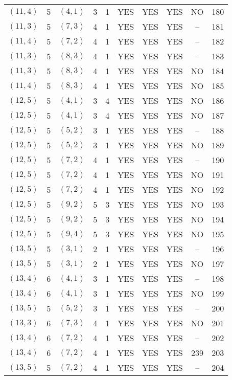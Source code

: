 \begin{longtable}{|c|c|c|c|c|c|c|c|c|c|}
$(11, 4)$ & 5 & $(4, 1)$ & 3 & 1 & YES & YES & YES & NO & 180\\
$(11, 3)$ & 5 & $(7, 3)$ & 4 & 1 & YES & YES & YES & -- & 181\\
$(11, 4)$ & 5 & $(7, 2)$ & 4 & 1 & YES & YES & YES & -- & 182\\
$(11, 3)$ & 5 & $(8, 3)$ & 4 & 1 & YES & YES & YES & -- & 183\\
$(11, 3)$ & 5 & $(8, 3)$ & 4 & 1 & YES & YES & YES & NO & 184\\
$(11, 4)$ & 5 & $(8, 3)$ & 4 & 1 & YES & YES & YES & NO & 185\\
$(12, 5)$ & 5 & $(4, 1)$ & 3 & 4 & YES & YES & YES & NO & 186\\
$(12, 5)$ & 5 & $(4, 1)$ & 3 & 4 & YES & YES & YES & NO & 187\\
$(12, 5)$ & 5 & $(5, 2)$ & 3 & 1 & YES & YES & YES & -- & 188\\
$(12, 5)$ & 5 & $(5, 2)$ & 3 & 1 & YES & YES & YES & NO & 189\\
$(12, 5)$ & 5 & $(7, 2)$ & 4 & 1 & YES & YES & YES & -- & 190\\
$(12, 5)$ & 5 & $(7, 2)$ & 4 & 1 & YES & YES & YES & NO & 191\\
$(12, 5)$ & 5 & $(7, 2)$ & 4 & 1 & YES & YES & YES & NO & 192\\
$(12, 5)$ & 5 & $(9, 2)$ & 5 & 3 & YES & YES & YES & NO & 193\\
$(12, 5)$ & 5 & $(9, 2)$ & 5 & 3 & YES & YES & YES & NO & 194\\
$(12, 5)$ & 5 & $(9, 4)$ & 5 & 3 & YES & YES & YES & NO & 195\\
$(13, 5)$ & 5 & $(3, 1)$ & 2 & 1 & YES & YES & YES & -- & 196\\
$(13, 5)$ & 5 & $(3, 1)$ & 2 & 1 & YES & YES & YES & NO & 197\\
$(13, 4)$ & 6 & $(4, 1)$ & 3 & 1 & YES & YES & YES & -- & 198\\
$(13, 4)$ & 6 & $(4, 1)$ & 3 & 1 & YES & YES & YES & NO & 199\\
$(13, 5)$ & 5 & $(5, 2)$ & 3 & 1 & YES & YES & YES & -- & 200\\
$(13, 3)$ & 6 & $(7, 3)$ & 4 & 1 & YES & YES & YES & NO & 201\\
$(13, 4)$ & 6 & $(7, 2)$ & 4 & 1 & YES & YES & YES & -- & 202\\
$(13, 4)$ & 6 & $(7, 2)$ & 4 & 1 & YES & YES & YES & 239 & 203\\
$(13, 5)$ & 5 & $(7, 2)$ & 4 & 1 & YES & YES & YES & -- & 204\\

\end{longtable}
